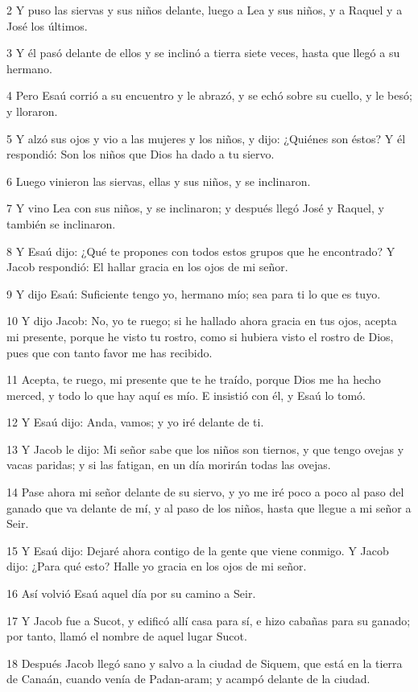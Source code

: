 2 Y puso las siervas y sus niños delante, luego a Lea y sus niños, y a Raquel y a José los últimos.

3 Y él pasó delante de ellos y se inclinó a tierra siete veces, hasta que llegó a su hermano.

4 Pero Esaú corrió a su encuentro y le abrazó, y se echó sobre su cuello, y le besó; y lloraron.

5 Y alzó sus ojos y vio a las mujeres y los niños, y dijo: ¿Quiénes son éstos? Y él respondió: Son los niños que Dios ha dado a tu siervo.

6 Luego vinieron las siervas, ellas y sus niños, y se inclinaron.

7 Y vino Lea con sus niños, y se inclinaron; y después llegó José y Raquel, y también se inclinaron.

8 Y Esaú dijo: ¿Qué te propones con todos estos grupos que he encontrado? Y Jacob respondió: El hallar gracia en los ojos de mi señor.

9 Y dijo Esaú: Suficiente tengo yo, hermano mío; sea para ti lo que es tuyo.

10 Y dijo Jacob: No, yo te ruego; si he hallado ahora gracia en tus ojos, acepta mi presente, porque he visto tu rostro, como si hubiera visto el rostro de Dios, pues que con tanto favor me has recibido.

11 Acepta, te ruego, mi presente que te he traído, porque Dios me ha hecho merced, y todo lo que hay aquí es mío. E insistió con él, y Esaú lo tomó.

12 Y Esaú dijo: Anda, vamos; y yo iré delante de ti.

13 Y Jacob le dijo: Mi señor sabe que los niños son tiernos, y que tengo ovejas y vacas paridas; y si las fatigan, en un día morirán todas las ovejas.

14 Pase ahora mi señor delante de su siervo, y yo me iré poco a poco al paso del ganado que va delante de mí, y al paso de los niños, hasta que llegue a mi señor a Seir.

15 Y Esaú dijo: Dejaré ahora contigo de la gente que viene conmigo. Y Jacob dijo: ¿Para qué esto? Halle yo gracia en los ojos de mi señor.

16 Así volvió Esaú aquel día por su camino a Seir.

17 Y Jacob fue a Sucot, y edificó allí casa para sí, e hizo cabañas para su ganado; por tanto, llamó el nombre de aquel lugar Sucot.

18 Después Jacob llegó sano y salvo a la ciudad de Siquem, que está en la tierra de Canaán, cuando venía de Padan-aram; y acampó delante de la ciudad.

